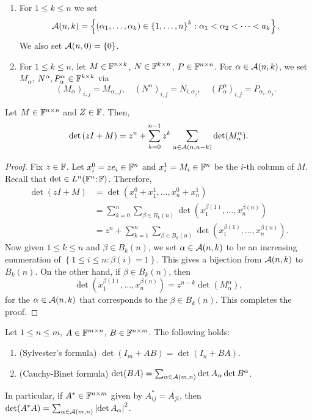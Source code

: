 \documentclass[a4paper]{article}
\begin{document}
\begin{defi}
\begin{enumerate}
\item For $1 \leq k \leq n$ we set
\[
\mathcal{A}(n, k) = \left\{ (\alpha_1, \dots, \alpha_k)
\in \left\{ 1, \dots, n \right\}^k :
\alpha_1 < \alpha_2 < \dots < a_k \right\}.
\]
We also set $\mathcal{A}(n, 0) = \left\{ 0 \right\}$.

\item For $1 \leq k \leq n$, let $M \in \mathbb{F}^{n \times k}$,
$N \in \mathbb{F}^{k \times n}$, $P \in \mathbb{F}^{n \times n}$. For
$\alpha \in \mathcal{A}(n, k)$, we set
$M_\alpha$, $N^\alpha, P_\alpha^\alpha \in \mathbb{F}^{k \times k}$
via
\[
(M_\alpha)_{i, j} = M_{\alpha_i, j}, \quad
(N^\alpha)_{i, j} = N_{i, \alpha_j}, \quad
(P_\alpha^\alpha)_{i, j} = P_{\alpha_i, \alpha_j}.
\]
\end{enumerate}
\end{defi}

\begin{thm}
Let $M \in \mathbb{F}^{n \times n}$ and $Z \in \mathbb{F}$. Then,
\[
\det \left( zI + M \right) = z^n + \sum_{k=0}^{n-1}
z^k \sum_{\alpha \in \mathcal{A}(n, n - k)} \det(M_\alpha^\alpha).
\]
\end{thm}

\begin{proof}
Fix $z \in \mathbb{F}$. Let $x_i^0 = z e_i \in \mathbb{F}^n$ and
$x_i^1 = M_i \in \mathbb{F}^n$ be the $i$-th column of $M$.
Recall that $\det \in L^n (\mathbb{F}^n ; \mathbb{F})$. Therefore,
\[
\begin{aligned}
\det (z I + M)
&= \det (x_1^0 + x_1^1, \dots, x_n^0 + x_n^1) \\
&= \sum_{k=0}^n \sum_{\beta \in B_k(n)}
\det (x_1^{\beta(1)}, \dots, x_n^{\beta(n)}) \\
&= z^n + \sum_{k=1}^n \sum_{\beta \in B_k(n)}
\det (x_1^{\beta(1)}, \dots, x_n^{\beta(n)}).
\end{aligned}
\]
Now given $1 \leq k \leq n$ and $\beta \in B_k(n)$,
we set $\alpha \in \mathcal{A}(n, k)$ to be an increasing
enumeration of $\left\{ 1 \leq i \leq n : \beta(i) = 1
\right\}$. This gives a bijection from $\mathcal{A}(n, k)$
to $B_k(n)$. On the other hand, if $\beta \in B_k(n)$,
then
\[
\det (x_1^{\beta(1)}, \dots, x_n^{\beta(n)})
= z^{n - k} \det(M_\alpha^\alpha),
\]
for the $\alpha \in \mathcal{A}(n, k)$ that corresponds to
the $\beta \in B_k(n)$. This completes the proof.
\end{proof}

\begin{thm}
Let $1 \leq n \leq m$, $A \in \mathbb{F}^{m \times n}$,
$B \in \mathbb{F}^{n \times m}$. The following holds:
\begin{enumerate}
\item (Sylvester's formula) $\det(I_m + A B)
= \det(I_n + BA)$.

\item (Cauchy-Binet formula) $\det(BA) = \sum_{\alpha
\in \mathcal{A}(m, n)} \det A_\alpha \det B^\alpha$.
\end{enumerate}
In particular, if $A^* \in \mathbb{F}^{n \times m}$ given
by $A^*_{ij} = \bar{A_{ji}}$, then
$\det(A^* A) = \sum_{\alpha \in \mathcal{A}(m, n)}
\left\lvert \det A_\alpha\right\rvert^2$.
\end{thm}
\end{document}
